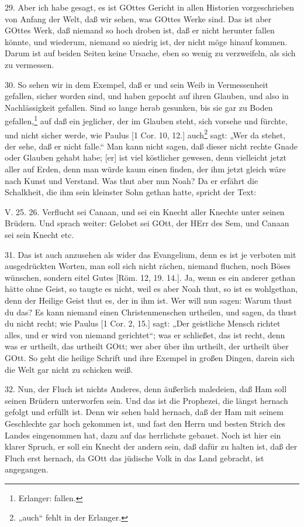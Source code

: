 29. Aber ich habe gesagt, es ist GOttes Gericht in allen Historien vorgeschrieben von Anfang der Welt, daß wir sehen, was GOttes Werke sind. Das ist aber GOttes Werk, daß niemand so hoch droben ist, daß er nicht herunter fallen könnte, und wiederum, niemand so niedrig ist, der nicht möge hinauf kommen. Darum ist auf beiden Seiten keine Ursache, eben so wenig zu verzweifeln, als sich zu vermessen.

30. So sehen wir in dem Exempel, daß er und sein Weib in Vermessenheit gefallen, sicher worden sind, und haben gepocht auf ihren Glauben, und also in Nachlässigkeit gefallen. Sind so lange herab gesunken, bis sie gar zu Boden gefallen,\footnote{Erlanger: fallen.} auf daß ein jeglicher, der im Glauben steht, sich vorsehe und fürchte, und nicht sicher werde, wie Paulus [1 Cor. 10, 12.] auch\footnote{„auch“ fehlt in der Erlanger.} sagt: „Wer da stehet, der sehe, daß er nicht falle.“ Man kann nicht sagen, daß dieser nicht rechte Gnade oder Glauben gehabt habe; [er] ist viel köstlicher gewesen, denn vielleicht jetzt aller auf Erden, denn man würde kaum einen finden, der ihm jetzt gleich wäre nach Kunst und Verstand. Was thut aber nun Noah? Da er erfährt die Schalkheit, die ihm sein kleinster Sohn gethan hatte, spricht der Text:

\begin{schriftzitat}
V. 25. 26. Verflucht sei Canaan, und sei ein Knecht aller Knechte unter seinen Brüdern. Und sprach weiter: Gelobet sei GOtt, der HErr des Sem, und Canaan sei sein Knecht etc.
\end{schriftzitat}

31. Das ist auch anzusehen als wider das Evangelium, denn es ist je verboten mit ausgedrückten Worten, man soll sich nicht rächen, niemand fluchen, noch Böses wünschen, sondern eitel Gutes [Röm. 12, 19. 14.]. Ja, wenn es ein anderer gethan hätte ohne Geist, so taugte es nicht, weil es aber Noah thut, so ist es wohlgethan, denn der Heilige Geist thut es, der in ihm ist. Wer will nun sagen: Warum thust du das? Es kann niemand einen Christenmenschen urtheilen, und sagen, da thust du nicht recht; wie Paulus [1 Cor. 2, 15.] sagt: „Der geistliche Mensch richtet alles, und er wird von niemand gerichtet“; was er schließet, das ist recht, denn was er urtheilt, das urtheilt GOtt; wer aber über ihn urtheilt, der urtheilt über GOtt. So geht die heilige Schrift und ihre Exempel in großen Dingen, darein sich die Welt gar nicht zu schicken weiß.

32. Nun, der Fluch ist nichts Anderes, denn äußerlich maledeien, daß Ham soll seinen Brüdern unterworfen sein. Und das ist die Prophezei, die längst hernach gefolgt und erfüllt ist. Denn wir sehen bald hernach, daß der Ham mit seinem Geschlechte gar hoch gekommen ist, und fast den Herrn und besten Strich des Landes eingenommen hat, dazu auf das herrlichste gebauet. Noch ist hier ein klarer Spruch, er soll ein Knecht der andern sein, daß dafür zu halten ist, daß der Fluch erst hernach, da GOtt das jüdische Volk in das Land gebracht, ist angegangen.


